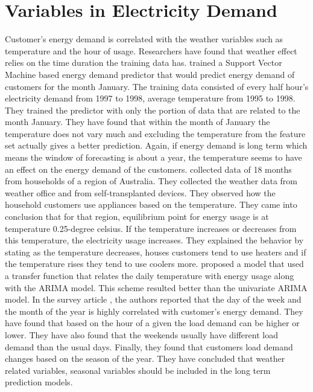 \section{Variables in Electricity Demand}
Customer's energy demand is correlated with the weather variables such as temperature and the hour of usage. Researchers have found that weather effect relies on the time duration the training data has. \cite{chen2004load} trained a Support Vector Machine based energy demand predictor that would predict energy demand of customers for the month January. The training data consisted of every half hour's electricity demand from 1997 to 1998, average temperature from 1995 to 1998. They trained the predictor with only the portion of data that are related to the month January. They have found that within the month of January the temperature does not vary much and excluding the temperature from the feature set actually gives a better prediction. Again, if energy demand is long term which means the window of forecasting is about a year, the temperature seems to have an effect on the energy demand of the customers. \cite{hart2004weather} collected data of 18 months from households of a region of Australia. They collected the weather data from weather office and from self-transplanted devices. They observed how the household customers use appliances based on the temperature. They came into conclusion that for that region, equilibrium point for energy usage is at temperature 0.25-degree celsius. If the temperature increases or decreases from this temperature, the electricity usage increases. They explained the behavior by stating as the temperature decreases, houses customers tend to use heaters and if the temperature rises they tend to use coolers more. \cite{cho1995customer} proposed a model that used a transfer function that relates the daily temperature with energy usage along with the ARIMA model. This scheme resulted better than the univariate ARIMA model. 
In the survey article \cite{hahn2009electric}, the authors reported that the day of the week and the month of the year is highly correlated with customer's energy demand. They have found that based on the hour of a given the load demand can be higher or lower. They have also found that the weekends usually have different load demand than the usual days. Finally, they found that customers load demand changes based on the season of the year. They have concluded that weather related variables, seasonal variables should be included in the long term prediction models.

